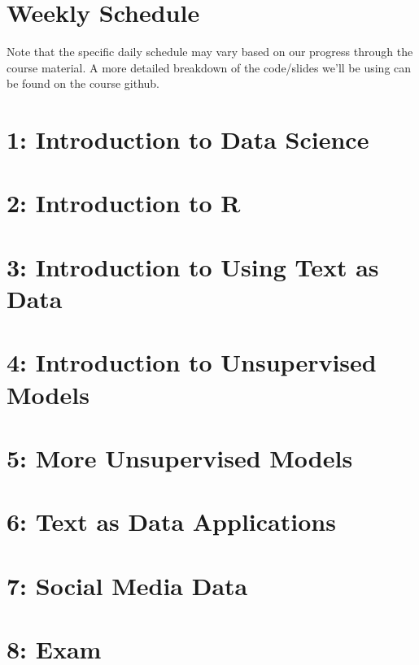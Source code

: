 \documentclass[]{article}
\begin{document}
	\section*{Weekly Schedule}
	Note that the specific daily schedule may vary based on our progress through the course material. A more detailed breakdown of the code/slides we'll be using can be found on the course github.
	
	\section*{\textnormal{1: Introduction to Data Science}}
	
	
	\section*{\textnormal{2: Introduction to R}}
	
	
	\section*{\textnormal{3: Introduction to Using Text as Data }}

	
	
	\section*{\textnormal{4: Introduction to Unsupervised Models}}

	
		\section*{\textnormal{5: More Unsupervised Models}}


 	\section*{\textnormal{6: Text as Data Applications}}
	
	

	\section*{\textnormal{7: Social Media Data}}



	\section*{\textnormal{8: Exam}}

	
	




				{}
				
	
	
	
	
	
\end{document}
